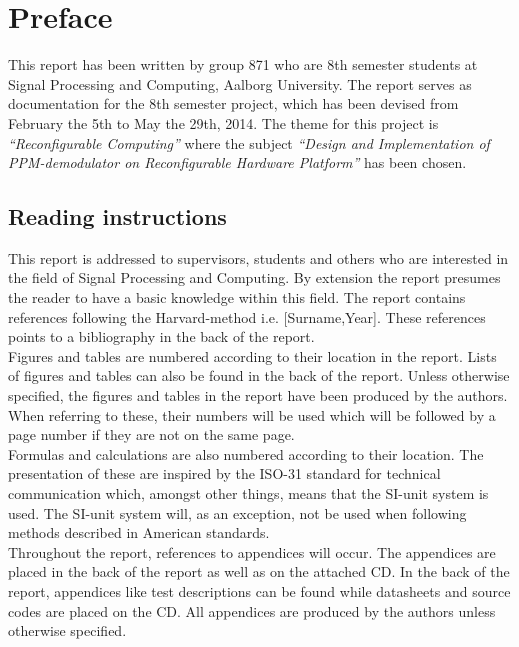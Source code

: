 \chapter*{Preface}
This report has been written by group 871 who are 8th semester students at Signal Processing and Computing, Aalborg University. The report serves as documentation for the 8th semester project, which has been devised from February the 5th to May the 29th, 2014. The theme for this project is \textit{``Reconfigurable Computing''} where the subject \textit{``Design and Implementation of PPM-demodulator on Reconfigurable Hardware Platform''} has been chosen.

\section*{Reading instructions}
This report is addressed to supervisors, students and others who are interested in the field of Signal Processing and Computing. By extension the report presumes the reader to have a basic knowledge within this field. The report contains references following the Harvard-method i.e. [Surname,Year]. These references points to a bibliography in the back of the report. \\

Figures and tables are numbered according to their location in the report. Lists of figures and tables can also be found in the back of the report. Unless otherwise specified, the figures and tables in the report have been produced by the authors. When referring to these, their numbers will be used which will be followed by a page number if they are not on the same page.\\

Formulas and calculations are also numbered according to their location. The presentation of these are inspired by the ISO-31 standard for technical communication which, amongst other things, means that the SI-unit system is used. The SI-unit system will, as an exception, not be used when following methods described in American standards.\\

Throughout the report, references to appendices will occur. The appendices are placed in the back of the report as well as on the attached CD. In the back of the report, appendices like test descriptions can be found while datasheets and source codes are placed on the CD. All appendices are produced by the authors unless otherwise specified.

